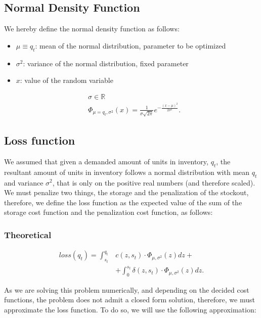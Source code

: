 \documentclass{OptiFlow}
\begin{document}
\subsection{Normal Density Function}
We hereby define the normal density function as follows:
\begin{itemize}
	\item $\mu \equiv q_t$: mean of the normal distribution, parameter to be optimized
	\item $\sigma^2$: variance of the normal distribution, fixed parameter
	\item $x$: value of the random variable
\end{itemize}

\begin{align*}
	&\sigma \in \mathbb{R}\\
	&\Phi_{\mu=q_t, \sigma^2}\left( x \right)   = \frac{1}{\sigma \sqrt{2\pi} }e^{- \frac{\left( x-\mu \right) ^2}{2 \sigma^2}}
.\end{align*}


\subsection{Loss function}
We assumed that given a demanded amount of units in inventory, $q_t$, the resultant amount of units in inventory
follows a normal distribution with mean $q_t$ and variance $\sigma^2$, that is only on the positive real numbers (and therefore scaled).
We must penalize two things, the storage and the penalization of the stockout, therefore, we define the loss function as 
the expected value of the sum of the storage cost function and the penalization cost function, as follows:

\subsubsection{Theoretical}
\begin{align*}
	loss\left( q_t \right)   = \int_{s_t}^{q_t} &c\left( z,s_t \right) \cdot \Phi_{\mu, \sigma^2}\left( z \right) dz+ \\
										&+ \int_{0}^{s_t} \delta\left( z,s_t \right)\cdot \Phi_{\mu, \sigma^2}\left( z \right) dz  
.\end{align*}

As we are solving this problem numerically, and depending on the decided cost 
functions, the problem does not admit a closed form solution, therefore, we must approximate the loss function.
To do so, we will use the following approximation:
\end{document}
